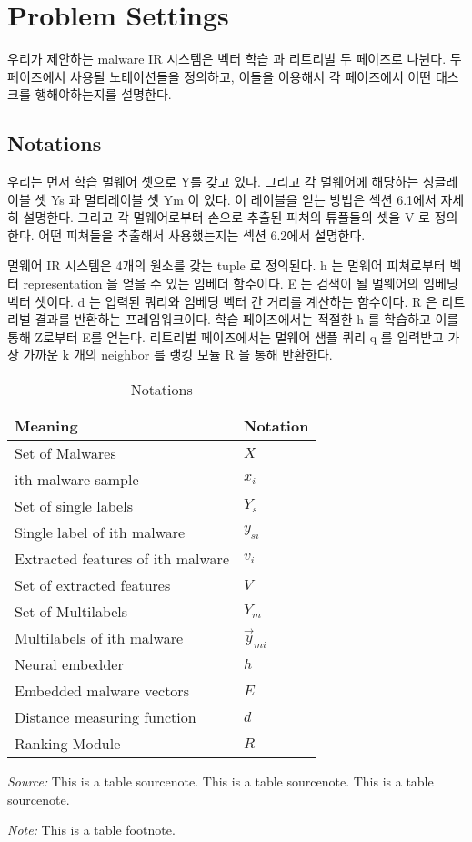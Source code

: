 \section{Problem Settings}

우리가 제안하는 malware IR 시스템은 벡터 학습 과 리트리벌 두 페이즈로 나뉜다. 두 페이즈에서 사용될 노테이션들을 정의하고, 이들을 이용해서 각 페이즈에서 어떤 태스크를 행해야하는지를 설명한다. 

\subsection{Notations}

우리는 먼저 학습 멀웨어 셋으로 Y를 갖고 있다. 그리고 각 멀웨어에 해당하는 싱글레이블 셋  Ys 과 멀티레이블 셋 Ym 이 있다. 이 레이블을 얻는 방법은 섹션 6.1에서 자세히 설명한다. 그리고 각 멀웨어로부터 손으로 추출된 피쳐의 튜플들의 셋을 V 로 정의한다. 어떤 피쳐들을 추출해서 사용했는지는 섹션 6.2에서 설명한다. 

멀웨어 IR 시스템은  4개의 원소를 갖는 tuple 로 정의된다. h 는 멀웨어 피쳐로부터 벡터 representation 을 얻을 수 있는 임베더 함수이다. E 는 검색이 될 멀웨어의 임베딩 벡터 셋이다. d 는 입력된 쿼리와 임베딩 벡터 간 거리를 계산하는 함수이다. R 은 리트리벌 결과를 반환하는 프레임워크이다. 학습 페이즈에서는 적절한 h 를 학습하고 이를 통해 Z로부터 E를 얻는다. 리트리벌 페이즈에서는 멀웨어 샘플 쿼리 q 를 입력받고 가장 가까운 k 개의 neighbor 를 랭킹 모듈 R 을 통해 반환한다.

\begin{table}%
\caption{Notations}
\label{tab:one}
\begin{minipage}{\columnwidth}
\begin{center}
\begin{tabular}{ll}
\toprule
Meaning & Notation\\
\midrule
  Set of Malwares     & $X$ \\
  ith malware sample  & $x_i$ \\
  Set of single labels & $Y_s$ \\
  Single label of ith malware    & $y_{si}$ \\
  Extracted features of ith malware & $v_i$ \\
  Set of extracted features   & $V$ \\
  Set of Multilabels   & $Y_m$ \\
  Multilabels of ith malware & $\vec{y}_{mi}$\\
  Neural embedder & $h$ \\
  Embedded malware vectors & $E$ \\
  Distance measuring function & $d$ \\
  Ranking Module & $R$\\
\bottomrule
\end{tabular}
\end{center}
\bigskip\centering
\footnotesize\emph{Source:} This is a table
 sourcenote. This is a table sourcenote. This is a table
 sourcenote.

 \emph{Note:} This is a table footnote.
\end{minipage}
\end{table}%



